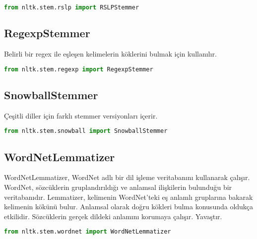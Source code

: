 \begin{lstlisting}[language=Python]
from nltk.stem.rslp import RSLPStemmer
\end{lstlisting}

\subsection{RegexpStemmer}
Belirli bir regex ile eşleşen kelimelerin köklerini bulmak için kullanılır.

\begin{lstlisting}[language=Python]
from nltk.stem.regexp import RegexpStemmer
\end{lstlisting}

\subsection{SnowballStemmer}
Çeşitli diller için farklı stemmer versiyonları içerir.

\begin{lstlisting}[language=Python]
from nltk.stem.snowball import SnowballStemmer
\end{lstlisting}

\subsection{WordNetLemmatizer}
WordNetLemmatizer, WordNet adlı bir dil işleme veritabanını kullanarak çalışır. WordNet, sözcüklerin gruplandırıldığı ve anlamsal ilişkilerin bulunduğu bir veritabanıdır. Lemmatizer, kelimenin WordNet'teki eş anlamlı gruplarına bakarak kelimenin kökünü bulur. Anlamsal olarak doğru kökleri bulma konusunda oldukça etkilidir. Sözcüklerin gerçek dildeki anlamını korumaya çalışır. Yavaştır.

\begin{lstlisting}[language=Python]
from nltk.stem.wordnet import WordNetLemmatizer
\end{lstlisting}

\newpage